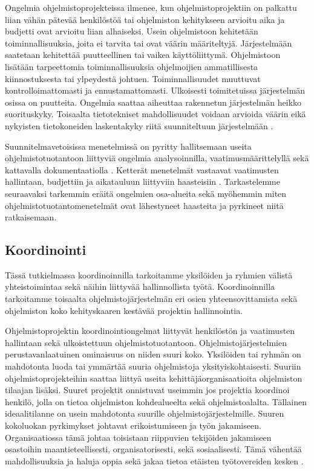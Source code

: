 \documentclass[finnish]{tktltiki2}
\theoremstyle{definition}
\theoremstyle{remark}
\begin{document}
Ongelmia  ohjelmistoprojekteissa ilmenee, kun ohjelmistoprojektiin on palkattu liian vähän pätevää henkilöstöä tai ohjelmiston kehitykseen arvioitu aika ja budjetti ovat arvioitu liian alhaiseksi. Usein ohjelmistoon kehitetään toiminnallisuuksia, joita ei tarvita tai ovat väärin määriteltyjä. Järjestelmään saatetaan kehitettää puutteellinen tai vaikea käyttöliittymä. Ohjelmistoon lisätään tarpeettomia toiminnallisuuksia ohjelmoijien ammatillisesta kiinnostuksesta tai ylpeydestä johtuen. Toiminnallisuudet muuttuvat kontrolloimattomasti ja ennustamattomasti. Ulkoisesti toimitetuissa järjestelmän osissa on puutteita. Ongelmia saattaa aiheuttaa rakennetun järjestelmän heikko suorituskyky. Toisaalta tietotekniset mahdollisuudet voidaan arvioida väärin eikä nykyisten tietokoneiden laskentakyky riitä suunniteltuun järjestelmään \cite{BOE88}.

 Suunnitelmavetoisissa menetelmissä on pyritty hallitsemaan useita ohjelmistotuotantoon liittyviä ongelmia analysoinnilla, vaatimusmäärittelyllä sekä kattavalla dokumentaatiolla \cite{ROY70}. Ketterät menetelmät vastaavat vaatimusten hallintaan, budjettiin ja aikatauluun liittyviin haasteisiin \cite{FOW01a}. Tarkastelemme seuraavaksi tarkemmin eräitä ongelmien osa-alueita sekä myöhemmin miten ohjelmistotuotantomenetelmät ovat lähestyneet haasteita ja pyrkineet niitä ratkaisemaan.

\subsection{Koordinointi}

Tässä tutkielmassa koordinoinnilla tarkoitamme yksilöiden ja ryhmien välistä yhteistoimintaa sekä näihin liittyvää hallinnollista työtä. Koordinoinnilla tarkoitamme toisaalta  ohjelmistojärjestelmän eri osien yhteensovittamista sekä ohjelmiston koko kehityskaaren kestävää projektin hallinnointia.

Ohjelmistoprojektin koordinointiongelmat liittyvät henkilöstön ja vaatimusten hallintaan sekä ulkoistettuun ohjelmistotuotantoon. Ohjelmisto\-järjestelmien perustavanlaatuinen ominaisuus on niiden suuri koko. Yksilöiden tai ryhmän on mahdotonta luoda tai ymmärtää suuria ohjelmistoja yksityiskohtaisesti. Suuriin ohjelmistoprojekteihin saattaa liittyä useita kehittäjä\-organisaatioita ohjelmiston tilaajan lisäksi. Suuret projektit onnistuvat useimmin jos projektia koordinoi henkilö, jolla on tietoa ohjelmiston kohdealueelta sekä ohjelmistoalalta. Tällainen ideaalitilanne on usein mahdotonta suurille ohjelmistojärjestelmille. Suuren kokoluokan pyrkimykset johtavat erikoistumiseen ja työn jakamiseen. Organisaatiossa tämä johtaa toisistaan riippuvien tekijöiden jakamiseen osastoihin maantieteellisesti, organisatorisesti, sekä sosiaalisesti. Tämä vähentää mahdollisuuksia ja haluja oppia sekä jakaa tietoa etäisten työtovereiden kesken \cite{KES95}.
\end{document}
